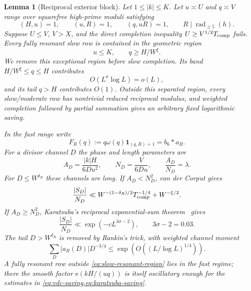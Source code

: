 \documentclass[11pt]{article}
\newtheorem{lemma}[lemma]{Lemma}
\theoremstyle{definition}
\theoremstyle{remark}
\newcommand{\rad}{\operatorname{rad}}
\newcommand{\e}{\mathrm e}
\newcommand{\1}{\mathbf 1}
\newcommand{\om}{\omega}
\begin{document}
\begin{lemma}[Reciprocal exterior block]\label{lem:reciprocal}
Let $1\le |k|\le K$. Let $u\asymp U$ and $q\asymp V$ range over squarefree high-prime moduli satisfying
\[
(H,u)=1,\qquad (u,R)=1,\qquad (q,uR)=1,
\qquad R\mid\rad_{\ge5}(h).
\]
Suppose $U\le V$, $V>X$, and the direct completion inequality $U\ge V^{1/2}T_{\rm comp}$ fails.  Every fully resonant slow row is contained in the geometric region
\begin{equation}\label{eq:slow-resonant-region}
\boxed{u\le K,\qquad q\ge H/W^\xi.}
\end{equation}
We remove this exceptional region before slow completion.  Its band $H/W^\xi\le q\le H$ contributes
\begin{equation}\label{eq:slow-resonant-band}
O(L^\sigma\log L)=o(L),
\end{equation}
and its tail $q>H$ contributes $O(1)$.  Outside this separated region, every slow/moderate row has nontrivial reduced reciprocal modulus, and weighted completion followed by partial summation gives an arbitrary fixed logarithmic saving.

In the fast range write
\[
F_R(q):=q\om(q)\1_{(q,R)=1}=b_6*a_R.
\]
For a divisor channel $D$ the phase and length parameters are
\begin{equation}\label{eq:ADND}
A_D=\frac{|k|H}{6Du^2},\qquad
N_D=\frac{V}{6Du},\qquad
\frac{A_D}{N_D}=\lambda.
\end{equation}
For $D\le W^{\delta_R}$ these channels are long.  If $A_D<N_D^2$, van der Corput gives
\begin{equation}\label{eq:vdc-saving}
\frac{|S_D|}{N_D}
 \ll W^{-(1-\delta_R)/2}T_{\rm comp}^{-1/4}+W^{-\xi/2}.
\end{equation}
If $A_D\ge N_D^2$, Karatsuba's reciprocal exponential-sum theorem~\cite{Karatsuba1971} gives
\begin{equation}\label{eq:karatsuba-saving}
\frac{|S_D|}{N_D}
 \ll \exp(-cL^{3\sigma-2}),
\qquad 3\sigma-2=0.03.
\end{equation}
The tail $D>W^{\delta_R}$ is removed by Rankin's trick, with weighted channel moment
\begin{equation}\label{eq:channel-moment}
\sum_D|a_R(D)|D^{-3/4}
 \le \exp\!\left(O((L/\log L)^{1/4})\right).
\end{equation}
A fully resonant row outside \cref{eq:slow-resonant-region} lies in the fast regime; there the smooth factor $\e(kH/(uq))$ is itself oscillatory enough for the estimates in \cref{eq:vdc-saving,eq:karatsuba-saving}.
\end{lemma}
\end{document}
